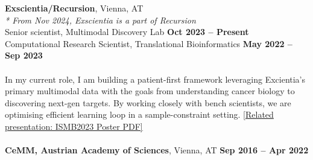 \documentclass[margin,line]{resume}
\begin{document}
\begin{resume}
   
      \textbf{Exscientia/Recursion}, Vienna, AT \\ 
      \textit{* From Nov 2024, Exscientia is a part of Recursion}
      \vspace{1mm}\\ 
    Senior scientist, Multimodal Discovery Lab \hfill \textbf{Oct 2023 -- Present}   \\ 
    Computational Research Scientist, Translational Bioinformatics \hfill \textbf{May 2022 -- Sep 2023} \vspace{-2mm}\\ \\
In my current role, I am building a patient-first framework leveraging Excientia's primary multimodal data with the goals from understanding cancer biology to discovering next-gen targets. By working closely with bench scientists, we are optimising efficient learning loop in a sample-constraint setting. \href{https://www.exscientia.com/wp-content/uploads/2024/01/ISMBECCB2023_1374_Buphamalai_poster.pdf}{[Related presentation: ISMB2023 Poster PDF]}  \\ \vspace{1mm}\\ 
    \textbf{CeMM, Austrian Academy of Sciences}, Vienna, AT \hfill \textbf{Sep 2016 -- Apr 2022} \vspace{1mm}\\ 

\end{resume}
\end{document}
